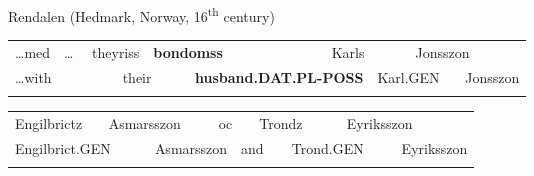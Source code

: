 \begin{listWWNumileveli}
\item 

\begin{styleExample}
Rendalen (Hedmark, Norway, 16\textsuperscript{th} century)

\end{styleExample}

\end{listWWNumileveli}

\begin{tabular}{llllllllllll}
\lsptoprule
…med & \multicolumn{2}{l}{…

} & \multicolumn{2}{l}{theyriss

} & \multicolumn{2}{l}{{\bfseries bondomss}

} & \multicolumn{2}{l}{Karls

} & \multicolumn{2}{l}{Jonsszon

} & \\
\multicolumn{2}{l}{…with

} & \multicolumn{2}{l}{} & \multicolumn{2}{l}{their

} & \multicolumn{2}{l}{{\bfseries husband.DAT.PL-POSS}

} & \multicolumn{2}{l}{Karl.GEN

} & \multicolumn{2}{l}{Jonsszon

}\\
\lspbottomrule
\end{tabular}

\begin{tabular}{llllllllll}
\lsptoprule
Engilbrictz & \multicolumn{2}{l}{Asmarsszon

} & \multicolumn{2}{l}{oc

} & \multicolumn{2}{l}{Trondz

} & \multicolumn{2}{l}{Eyriksszon

} & \\
\multicolumn{2}{l}{Engilbrict.GEN

} & \multicolumn{2}{l}{Asmarsszon

} & \multicolumn{2}{l}{and

} & \multicolumn{2}{l}{Trond.GEN

} & \multicolumn{2}{l}{ Eyriksszon

}\\
\lspbottomrule
\end{tabular}

